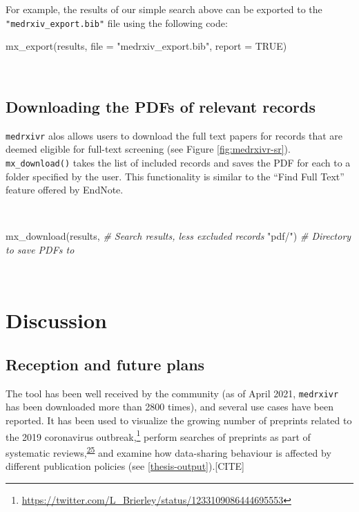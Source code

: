 \documentclass[a4paper, twoside]{templates/ociamthesis}
\newenvironment{Shaded}{\begin{snugshade}}{\end{snugshade}}
\newcommand{\AttributeTok}[1]{\textcolor[rgb]{0.77,0.63,0.00}{#1}}
\newcommand{\CommentTok}[1]{\textcolor[rgb]{0.56,0.35,0.01}{\textit{#1}}}
\newcommand{\ConstantTok}[1]{\textcolor[rgb]{0.00,0.00,0.00}{#1}}
\newcommand{\FunctionTok}[1]{\textcolor[rgb]{0.00,0.00,0.00}{#1}}
\newcommand{\NormalTok}[1]{#1}
\newcommand{\StringTok}[1]{\textcolor[rgb]{0.31,0.60,0.02}{#1}}
\renewenvironment{Shaded}
{
  \vspace{4pt}%
  \begin{snugshade}%
}{%
  \end{snugshade}%
  \vspace{4pt}%
}
\begin{document}
For example, the results of our simple search above can be exported to the \texttt{"medrxiv\_export.bib"} file using the following code:

\begin{Shaded}
\begin{Highlighting}[]
\FunctionTok{mx\_export}\NormalTok{(results, }
          \AttributeTok{file =} \StringTok{"medrxiv\_export.bib"}\NormalTok{,}
          \AttributeTok{report =} \ConstantTok{TRUE}\NormalTok{)}
\end{Highlighting}
\end{Shaded}

~

\hypertarget{downloading-the-pdfs-of-relevant-records}{%
\subsection{Downloading the PDFs of relevant records}\label{downloading-the-pdfs-of-relevant-records}}

\texttt{medrxivr} alos allows users to download the full text papers for records that are deemed eligible for full-text screening (see Figure \ref{fig:medrxivr-sr}). \texttt{mx\_download()} takes the list of included records and saves the PDF for each to a folder specified by the user. This functionality is similar to the ``Find Full Text'' feature offered by EndNote.

~

\begin{Shaded}
\begin{Highlighting}[]
\FunctionTok{mx\_download}\NormalTok{(results,  }\CommentTok{\# Search results, less excluded records}
            \StringTok{"pdf/"}\NormalTok{)   }\CommentTok{\# Directory to save PDFs to }
\end{Highlighting}
\end{Shaded}

~

\hypertarget{discussion}{%
\section{Discussion}\label{discussion}}

\hypertarget{reception-and-future-plans}{%
\subsection{Reception and future plans}\label{reception-and-future-plans}}

The tool has been well received by the community (as of April 2021, \texttt{medrxivr} has been downloaded more than 2800 times), and several use cases have been reported. It has been used to visualize the growing number of preprints related to the 2019 coronavirus outbreak,\footnote{\url{https://twitter.com/L_Brierley/status/1233109086444695553}} perform searches of preprints as part of systematic reviews,\textsuperscript{\protect\hyperlink{ref-noone2020}{25}} and examine how data-sharing behaviour is affected by different publication policies (see \ref{thesis-output}).{[}CITE{]}
\end{document}
